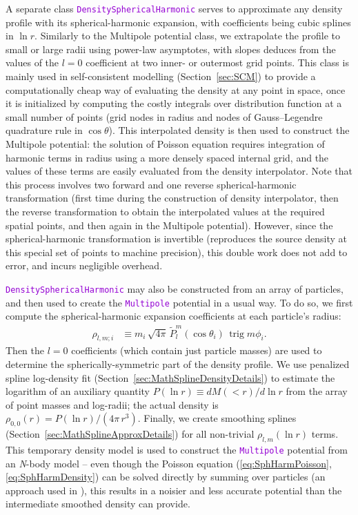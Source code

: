 \documentclass[12pt]{article}
\newcommand{\Nbody}{\textsl{N}-body\xspace}
\newcommand{\ttt}[1]{\textcolor{darkviolet}{\texttt{#1}}}
\DeclareMathOperator{\trig}{trig}
\begin{document}
A separate class \ttt{DensitySphericalHarmonic} serves to approximate any density profile with its spherical-harmonic expansion, with coefficients being cubic splines in $\ln r$. 
Similarly to the Multipole potential class, we extrapolate the profile to small or large radii using power-law asymptotes, with slopes deduces from the values of the $l=0$ coefficient at two inner- or outermost grid points. This class is mainly used in self-consistent modelling (Section~\ref{sec:SCM}) to provide a computationally cheap way of evaluating the density at any point in space, once it is initialized by computing the costly integrals over distribution function at a small number of points (grid nodes in radius and nodes of Gauss--Legendre quadrature rule in $\cos\theta$). This interpolated density is then used to construct the Multipole potential: the solution of Poisson equation requires integration of harmonic terms in radius using a more densely spaced internal grid, and the values of these terms are easily evaluated from the density interpolator. Note that this process involves two forward and one reverse spherical-harmonic transformation (first time during the construction of density interpolator, then the reverse transformation to obtain the interpolated values at the required spatial points, and then again in the Multipole potential). However, since the spherical-harmonic transformation is invertible (reproduces the source density at this special set of points to machine precision), this double work does not add to error, and incurs negligible overhead.

\ttt{DensitySphericalHarmonic} may also be constructed from an array of particles, and then used to create the \ttt{Multipole} potential in a usual way. To do so, we first compute the spherical-harmonic expansion coefficients at each particle's radius:
\begin{align*}
\rho_{l,m;i} &\equiv m_i\,\sqrt{4\pi}\,\tilde P_l^m(\cos\theta_i)\,\trig m\phi_i .
\end{align*}
Then the $l=0$ coefficients (which contain just particle masses) are used to determine the spherically-symmetric part of the density profile. We use penalized spline log-density fit (Section~\ref{sec:MathSplineDensityDetails}) to estimate the logarithm of an auxiliary quantity $P(\ln r) \equiv dM(<r)/d\ln r$ from the array of point masses and log-radii; the actual density is $\rho_{0,0}(r) = P(\ln r) / (4\pi\,r^3)$. Finally, we create smoothing splines (Section~\ref{sec:MathSplineApproxDetails}) for all non-trivial $\rho_{l,m}(\ln r)$ terms.
This temporary density model is used to construct the \ttt{Multipole} potential from an \Nbody model -- even though the Poisson equation (\ref{eq:SphHarmPoisson},\ref{eq:SphHarmDensity}) can be solved directly by summing over particles (an approach used in \cite{Vasiliev2013}), this results in a noisier and less accurate potential than the intermediate smoothed density can provide.
\end{document}
